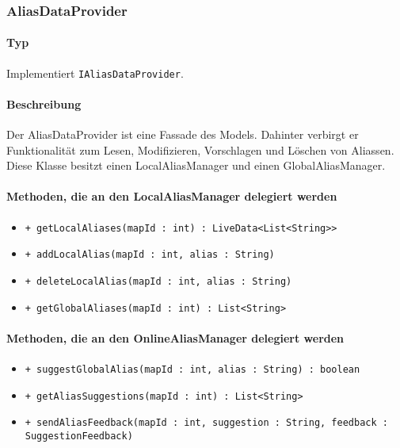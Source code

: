 \subsubsection{AliasDataProvider}
\paragraph*{Typ}
Implementiert \texttt{IAliasDataProvider}.
\paragraph*{Beschreibung}
Der AliasDataProvider ist eine Fassade des Models. 
Dahinter verbirgt er Funktionalität zum Lesen, Modifizieren, Vorschlagen und Löschen von Aliassen.\\
Diese Klasse besitzt einen LocalAliasManager und einen GlobalAliasManager.

\paragraph*{Methoden, die an den LocalAliasManager delegiert werden}
\begin{itemize}
    \item \texttt{+ getLocalAliases(mapId : int) : LiveData<List<String>>}
    \item \texttt{+ addLocalAlias(mapId : int, alias : String)}
    \item \texttt{+ deleteLocalAlias(mapId : int, alias : String)}
    \item \texttt{+ getGlobalAliases(mapId : int) : List<String>}%
\end{itemize}

\paragraph*{Methoden, die an den OnlineAliasManager delegiert werden}
\begin{itemize}
    \item \texttt{+ suggestGlobalAlias(mapId : int, alias : String) : boolean}
    \item \texttt{+ getAliasSuggestions(mapId : int) : List<String>}
    \item \texttt{+ sendAliasFeedback(mapId : int, suggestion : String, feedback : SuggestionFeedback)}
\end{itemize}
